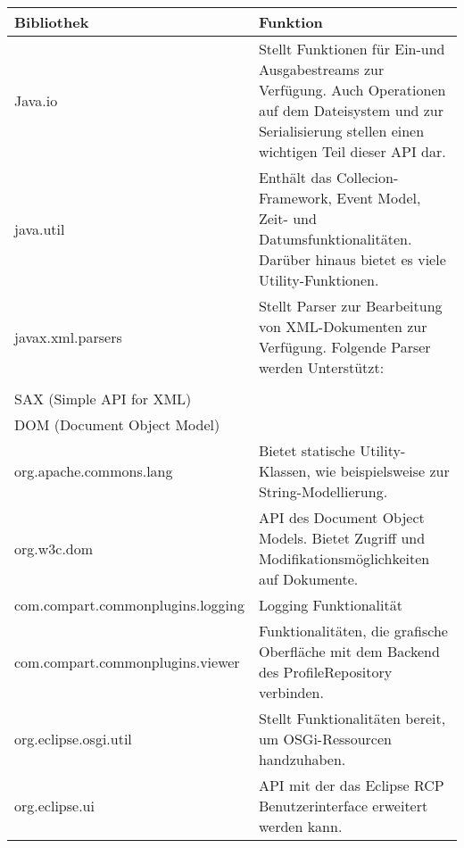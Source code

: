 {{{{{\begin{table}
    \begin{tabular}{|l|l|}
    \hline
    Bibliothek                        & Funktion                                                                                                                                                             \\ \hline
    Java.io                           & Stellt Funktionen für Ein-und Ausgabestreams zur Verfügung. Auch Operationen auf dem Dateisystem und zur Serialisierung stellen einen wichtigen Teil dieser API dar. \\ \hline
    java.util                         & Enthält das Collecion-Framework, Event Model, Zeit- und Datumsfunktionalitäten. Darüber hinaus bietet es viele Utility-Funktionen.                                   \\ \hline
    javax.xml.parsers                 & Stellt Parser zur Bearbeitung von XML-Dokumenten zur Verfügung. Folgende Parser werden Unterstützt:\\\\SAX (Simple API for XML)\\DOM (Document Object Model)         \\ \hline
    org.apache.commons.lang           & Bietet statische Utility-Klassen, wie beispielsweise zur String-Modellierung.                                                                                        \\ \hline
    org.w3c.dom                       & API des Document Object Models. Bietet Zugriff und Modifikationsmöglichkeiten auf Dokumente.                                                                         \\ \hline
    com.compart.commonplugins.logging & Logging Funktionalität                                                                                                                                               \\ \hline
    com.compart.commonplugins.viewer  & Funktionalitäten, die grafische Oberfläche mit dem Backend des ProfileRepository verbinden.                                                                          \\ \hline
    org.eclipse.osgi.util             & Stellt Funktionalitäten bereit, um OSGi-Ressourcen handzuhaben.                                                                                                      \\ \hline
    org.eclipse.ui                    & API mit der das Eclipse RCP Benutzerinterface erweitert werden kann.                                                                                                 \\ \hline

\end{tabular}
\end{table}}}}}}
